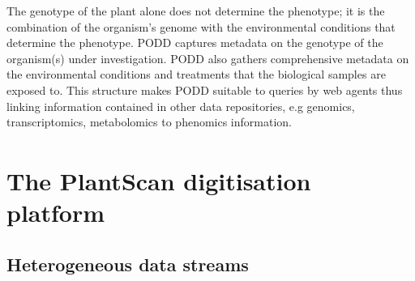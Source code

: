 \documentclass{llncs}
\begin{document}
The genotype of the plant alone does not determine the phenotype; it is the
combination of the organism’s genome with the environmental conditions that
determine the phenotype. PODD captures metadata on the genotype of the
organism(s) under investigation. PODD also gathers comprehensive metadata on the
environmental conditions and treatments that the biological samples are exposed
to. This structure makes PODD suitable to queries by web agents thus  linking
information contained in other data repositories, e.g genomics, transcriptomics,
metabolomics to phenomics information.  


\section{The PlantScan\textsuperscript{\texttrademark} digitisation platform}


\subsection{Heterogeneous data streams}
\end{document}
